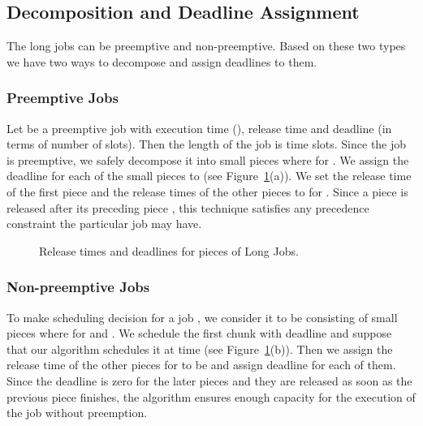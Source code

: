 \documentclass[10pt,conference,compsocconf,letterpaper]{IEEEtran}
\begin{document}
\subsection{Decomposition and Deadline Assignment}
The long jobs can be preemptive and non-preemptive. Based on these two types we have two ways to decompose and assign deadlines to them.

\subsubsection*{Preemptive Jobs}
Let  be a preemptive job with execution time  (), release time  and deadline  (in terms of number of slots). Then the length of the job  is  time slots. Since the job is preemptive, we safely decompose it into small pieces  where  for . We assign the deadline for each of the small pieces to  (see Figure~\ref{fig:longjob}(a)). We set the release time of the first piece  and the release times of the other pieces to  for . Since a piece  is released after its preceding piece , this technique satisfies any precedence constraint the particular job may have.


\begin{figure}[!ht]
\centerline{
\hfil
{}}
\caption{Release times and deadlines for pieces of Long Jobs.}
\label{fig:longjob}
\end{figure}














\subsubsection*{Non-preemptive Jobs}
To make scheduling decision for a job , we consider it to be consisting of  small pieces where  for  and . We schedule the first chunk  with deadline  and suppose that our algorithm schedules it at time  (see Figure~\ref{fig:longjob}(b)). Then we assign the release time of the other pieces  for  to be  and assign deadline  for each of them. Since the deadline is zero for the later pieces and they are released as soon as the previous piece finishes, the algorithm ensures enough capacity for the execution of the job without preemption.
\end{document}
